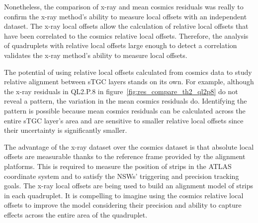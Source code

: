 Nonetheless, the comparison of x-ray and mean cosmics residuals was really to confirm the x-ray method's ability to measure local offsets with an independent dataset. The x-ray local offsets allow the calculation of relative local offsets that have been correlated to the cosmics relative local offsets. Therefore, the analysis of quadruplets with relative local offsets large enough to detect a correlation validates the x-ray method's ability to measure local offsets. 

The potential of using relative local offsets calculated from cosmics data to study relative alignment between sTGC layers stands on its own. For example, although the x-ray residuals in QL2.P.8 in figure~\ref{fig:res_compare_th2_ql2p8} do not reveal a pattern, the variation in the mean cosmics residuals do. Identifying the pattern is possible because mean cosmics residuals can be calculated across the entire sTGC layer's area and are sensitive to smaller relative local offsets since their uncertainty is significantly smaller. 

The advantage of the x-ray dataset over the cosmics dataset is that absolute local offsets are measurable thanks to the reference frame provided by the alignment platforms. This is required to measure the position of strips in the ATLAS coordinate system and to satisfy the NSWs' triggering and precision tracking goals. The x-ray local offsets are being used to build an alignment model of strips in each quadruplet. It is compelling to imagine using the cosmics relative local offsets to improve the model considering their precision and ability to capture effects across the entire area of the quadruplet.